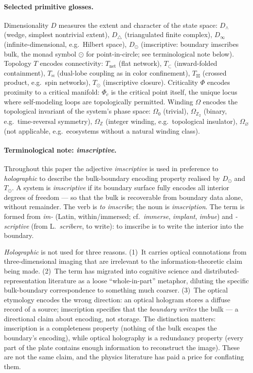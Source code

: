 \documentclass[12pt,a4paper]{article}
\newcommand{\Phic}{\Phi_c}
\newcommand{\Tbw}{T_{\mathord{\bowtie}}}
\newcommand{\Tin}{T_{\mathord{\subset}}}
\newcommand{\Tbox}{T_{\mathord{\boxtimes}}}
\begin{document}
\paragraph{Selected primitive glosses.}
Dimensionality $D$ measures the extent and character of the state
space: $D_\wedge$ (wedge, simplest nontrivial extent), $D_\triangle$
(triangulated finite complex), $D_\infty$ (infinite-dimensional, e.g.\
Hilbert space), $D_\odot$ (imscriptive: boundary imscribes bulk, the
monad symbol $\odot$ for point-in-circle; see terminological note below). Topology $T$ encodes
connectivity: $T_\text{net}$ (flat network), $\Tin$
(inward-folded containment), $\Tbw$ (dual-lobe coupling as in
color confinement), $\Tbox$ (crossed product, e.g.\ spin
networks), $T_\odot$ (imscriptive closure). Criticality $\Phi$
encodes proximity to a critical manifold: $\Phic$ is the
critical point itself, the unique locus where self-modeling loops are
topologically permitted. Winding $\Omega$ encodes the topological
invariant of the system's phase space: $\Omega_0$ (trivial),
$\Omega_{\mathbb{Z}_2}$ (binary, e.g.\ time-reversal symmetry),
$\Omega_\mathbb{Z}$ (integer winding, e.g.\ topological insulator),
$\Omega_\varnothing$ (not applicable, e.g.\ ecosystems without a
natural winding class).

\paragraph{Terminological note: \emph{imscriptive}.}
\label{par:imscriptive}
Throughout this paper the adjective \emph{imscriptive} is used in preference
to \emph{holographic} to describe the bulk-boundary encoding property
realised by $D_\odot$ and $T_\odot$. A system is \emph{imscriptive} if
its boundary surface fully encodes all interior degrees of freedom ---
so that the bulk is recoverable from boundary data alone, without
remainder. The verb is \emph{to imscribe}; the noun is
\emph{imscription}. The term is formed from \emph{im-} (Latin, within/immersed;
cf.\ \emph{immerse}, \emph{implant}, \emph{imbue}) and \emph{-scriptive}
(from L.\ \emph{scribere}, to write): to imscribe is to write the
interior into the boundary.

\emph{Holographic} is not used for three reasons.
(1)~It carries optical connotations from three-dimensional imaging that are
irrelevant to the information-theoretic claim being made.
(2)~The term has migrated into cognitive science and
distributed-representation literature as a loose ``whole-in-part''
metaphor, diluting the specific bulk-boundary correspondence to
something much coarser.
(3)~The optical etymology encodes the wrong direction: an optical
hologram stores a diffuse record of a source; imscription specifies
that the \emph{boundary writes} the bulk --- a directional claim about
encoding, not storage. The distinction matters: imscription is a
completeness property (nothing of the bulk escapes the boundary's
encoding), while optical holography is a redundancy property (every
part of the plate contains enough information to reconstruct the image).
These are not the same claim, and the physics literature has paid a
price for conflating them.
\end{document}

